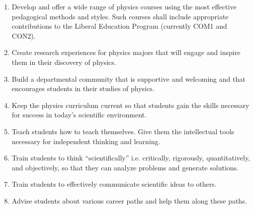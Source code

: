 \documentclass[../../main.tex]{subfiles}
\begin{document}
\begin{enumerate}
\item Develop and offer a wide range of physics courses using the most effective pedagogical methods and styles.  Such courses shall include appropriate contributions to the Liberal Education Program (currently COM1 and CON2).
\item Create research experiences for physics majors that will engage and inspire them in their discovery of physics.
\item Build a departmental community that is supportive and welcoming and that encourages students in their studies of physics.
\item Keep the physics curriculum current so that students gain the skills necessary for success in today’s scientific environment.
\item Teach students how to teach themselves. Give them the intellectual tools necessary for independent thinking and learning.
\item Train students to think ``scientifically'' i.e. critically, rigorously, quantitatively, and objectively, so that they can analyze problems and generate solutions.
\item Train students to effectively communicate scientific ideas to others.
\item Advise students about various career paths and help them along these paths.
\end{enumerate}
\end{document}
